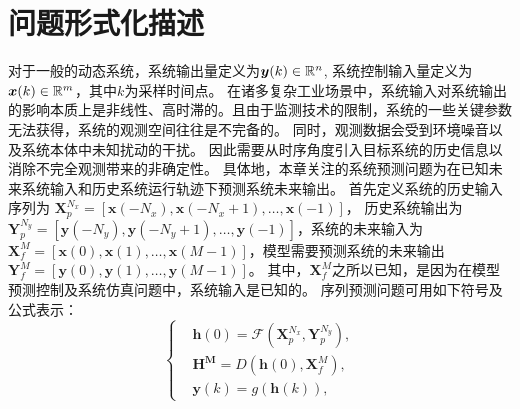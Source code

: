 \section{问题形式化描述}
\label{sec:formulate}
对于一般的动态系统，系统输出量定义为$\boldsymbol y(k) \in \mathbb{R}^n$,
系统控制输入量定义为$\boldsymbol x(k)\in \mathbb{R}^m$，其中$k$为采样时间点。
在诸多复杂工业场景中，系统输入对系统输出的影响本质上是非线性、高时滞的。且由于监测技术的限制，系统的一些关键参数无法获得，系统的观测空间往往是不完备的。
同时，观测数据会受到环境噪音以及系统本体中未知扰动的干扰。
因此需要从时序角度引入目标系统的历史信息以消除不完全观测带来的非确定性。
具体地，本章关注的系统预测问题为在已知未来系统输入和历史系统运行轨迹下预测系统未来输出。
首先定义系统的历史输入序列为 $\boldsymbol X_p^{N_x}=[\boldsymbol x(-N_x),\boldsymbol x(-N_x+1), \dots, \boldsymbol x(-1)]$， 历史系统输出为 
$\boldsymbol Y_p^{N_y}=[\boldsymbol y(-N_y),\boldsymbol y(-N_y+1),\dots, \boldsymbol y(-1)]$，系统的未来输入为 $\boldsymbol X_f^{M}=[\boldsymbol x(0),\boldsymbol x(1),\dots,\boldsymbol x(M-1)]$，模型需要预测系统的未来输出$\boldsymbol Y_f^{M}=[\boldsymbol y(0),\boldsymbol y(1),\dots,\boldsymbol y(M-1)]$。
其中，$\boldsymbol X_f^{M}$之所以已知，是因为在模型预测控制及系统仿真问题中，系统输入是已知的。
序列预测问题可用如下符号及公式表示：
\begin{equation}
\label{equ:discrete_seq2seq}
\left\{
\begin{aligned}
&\boldsymbol{h}(0) = \mathcal{F}(\boldsymbol X_p^{N_x}, \boldsymbol{Y}_p^{N_y}), \\
&\boldsymbol{H^M} = D(\boldsymbol{h}(0), \boldsymbol {X}_f^{M}),\\
&\boldsymbol{y}(k) = g(\boldsymbol{h}(k)),
\end{aligned}
\right.
\end{equation}

